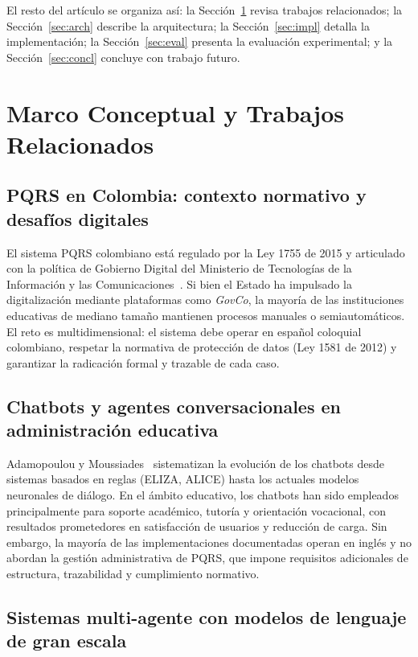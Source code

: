 \documentclass[runningheads]{llncs}
\begin{document}
El resto del artículo se organiza así: la Sección~\ref{sec:related} revisa trabajos relacionados; la Sección~\ref{sec:arch} describe la arquitectura; la Sección~\ref{sec:impl} detalla la implementación; la Sección~\ref{sec:eval} presenta la evaluación experimental; y la Sección~\ref{sec:concl} concluye con trabajo futuro.

\section{Marco Conceptual y Trabajos Relacionados}
\label{sec:related}

\subsection{PQRS en Colombia: contexto normativo y desafíos digitales}

El sistema PQRS colombiano está regulado por la Ley 1755 de 2015 y articulado con la política de Gobierno Digital del Ministerio de Tecnologías de la Información y las Comunicaciones~\cite{digital_gov}. Si bien el Estado ha impulsado la digitalización mediante plataformas como \textit{GovCo}, la mayoría de las instituciones educativas de mediano tamaño mantienen procesos manuales o semiautomáticos. El reto es multidimensional: el sistema debe operar en español coloquial colombiano, respetar la normativa de protección de datos (Ley 1581 de 2012) y garantizar la radicación formal y trazable de cada caso.

\subsection{Chatbots y agentes conversacionales en administración educativa}

Adamopoulou y Moussiades~\cite{conversational_agents} sistematizan la evolución de los chatbots desde sistemas basados en reglas (ELIZA, ALICE) hasta los actuales modelos neuronales de diálogo. En el ámbito educativo, los chatbots han sido empleados principalmente para soporte académico, tutoría y orientación vocacional, con resultados prometedores en satisfacción de usuarios y reducción de carga. Sin embargo, la mayoría de las implementaciones documentadas operan en inglés y no abordan la gestión administrativa de PQRS, que impone requisitos adicionales de estructura, trazabilidad y cumplimiento normativo.

\subsection{Sistemas multi-agente con modelos de lenguaje de gran escala}
\end{document}
